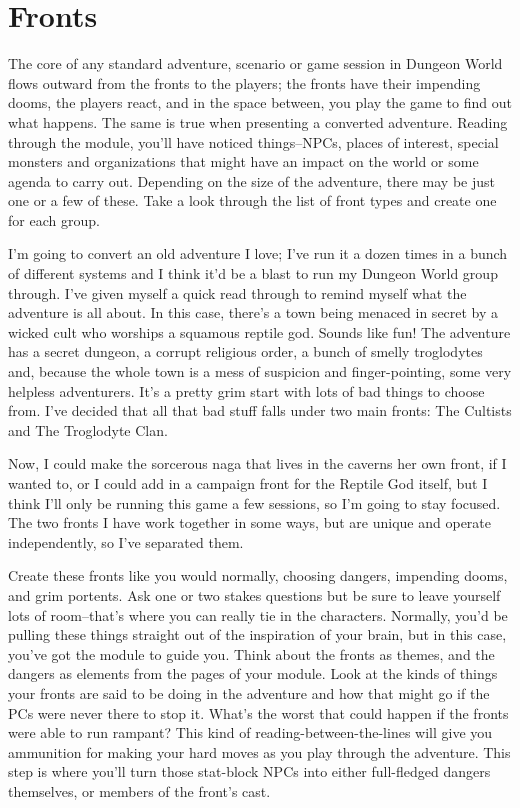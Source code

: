 \section{Fronts}


 The core of any standard adventure, scenario or game session in Dungeon World flows outward from the fronts to the players; the fronts have their impending dooms, the players react, and in the space between, you play the game to find out what happens. The same is true when presenting a converted adventure. Reading through the module, you'll have noticed things--NPCs, places of interest, special monsters and organizations that might have an impact on the world or some agenda to carry out. Depending on the size of the adventure, there may be just one or a few of these. Take a look through the list of front types and create one for each group.


 I'm going to convert an old adventure I love; I've run it a dozen times in a bunch of different systems and I think it'd be a blast to run my Dungeon World group through. I've given myself a quick read through to remind myself what the adventure is all about. In this case, there's a town being menaced in secret by a wicked cult who worships a squamous reptile god. Sounds like fun! The adventure has a secret dungeon, a corrupt religious order, a bunch of smelly troglodytes and, because the whole town is a mess of suspicion and finger-pointing, some very helpless adventurers. It's a pretty grim start with lots of bad things to choose from. I've decided that all that bad stuff falls under two main fronts: The Cultists and The Troglodyte Clan.


 Now, I could make the sorcerous naga that lives in the caverns her own front, if I wanted to, or I could add in a campaign front for the Reptile God itself, but I think I'll only be running this game a few sessions, so I'm going to stay focused. The two fronts I have work together in some ways, but are unique and operate independently, so I've separated them.


 Create these fronts like you would normally, choosing dangers, impending dooms, and grim portents. Ask one or two stakes questions but be sure to leave yourself lots of room--that's where you can really tie in the characters. Normally, you'd be pulling these things straight out of the inspiration of your brain, but in this case, you've got the module to guide you. Think about the fronts as themes, and the dangers as elements from the pages of your module. Look at the kinds of things your fronts are said to be doing in the adventure and how that might go if the PCs were never there to stop it. What's the worst that could happen if the fronts were able to run rampant? This kind of reading-between-the-lines will give you ammunition for making your hard moves as you play through the adventure. This step is where you'll turn those stat-block NPCs into either full-fledged dangers themselves, or members of the front's cast.


